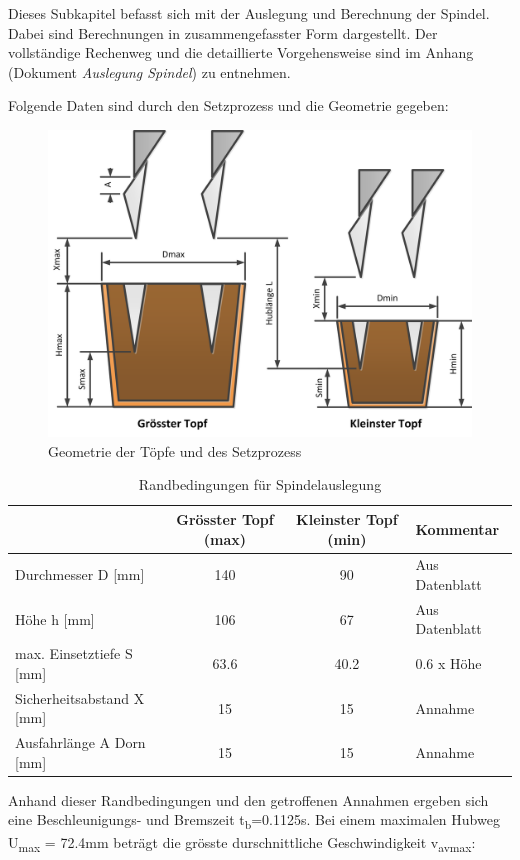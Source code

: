 Dieses Subkapitel befasst sich mit der Auslegung und Berechnung der Spindel. Dabei sind Berechnungen in zusammengefasster Form dargestellt. Der vollständige Rechenweg und die detaillierte Vorgehensweise sind im Anhang (Dokument \textit{Auslegung Spindel}) zu entnehmen.

Folgende Daten sind durch den Setzprozess und die Geometrie gegeben:
	\begin{figure}[H]
	\includegraphics[width=1\textwidth]{Illustrationen/6-Umsetzung/topfgeometrie.png}
	\caption{Geometrie der Töpfe und des Setzprozess}
	\label{fig:topfgeometrie}
	\end{figure}
\begin{table}[H]
\begin{tabular}{|l|c|c|l|}
	\hline 
	& Grösster Topf (max) & Kleinster Topf (min) & Kommentar \\ 
	\hline 
	Durchmesser D [mm] & 140 & 90 & Aus Datenblatt \\ 
	\hline 
	Höhe h [mm] & 106 & 67 & Aus Datenblatt \\ 
	\hline 
	max. Einsetztiefe S [mm] & 63.6 & 40.2 & 0.6 x Höhe \\ 
	\hline 
	Sicherheitsabstand X [mm] & 15 & 15 & Annahme \\ 
	\hline 
	Ausfahrlänge A Dorn [mm] & 15 & 15 & Annahme \\ 
	\hline 
\end{tabular} 
	\caption{Randbedingungen für Spindelauslegung}
	\label{tab:Randbedingungen}
\end{table}

Anhand dieser Randbedingungen und den getroffenen Annahmen ergeben sich eine Beschleunigungs- und Bremszeit t\textsubscript{b}=0.1125s. Bei einem maximalen Hubweg U\textsubscript{max} = 72.4mm beträgt die grösste durschnittliche Geschwindigkeit v\textsubscript{avmax}:


